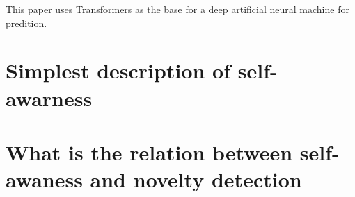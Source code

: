 \documentclass[a4paper]{article}
\begin{document}
    
    This paper uses Transformers as the base for a deep artificial neural machine for predition.
    
    
    \section{Simplest description of self-awarness}
    
    
    \section{What is the relation between self-awaness and novelty detection}
    
    
    
    
    
\end{document}

